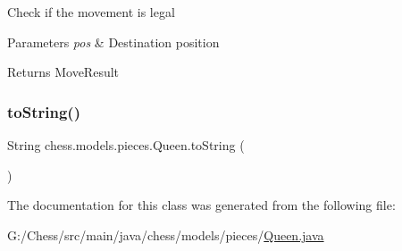 Check if the movement is legal 
\begin{DoxyParams}{Parameters}
{\em pos} & Destination position \\
\hline
\end{DoxyParams}
\begin{DoxyReturn}{Returns}
Move\+Result 
\end{DoxyReturn}
\mbox{\label{classchess_1_1models_1_1pieces_1_1_queen_a723a09d8252bb14578d33c099242e37d}} 
\subsubsection{\texorpdfstring{to\+String()}{toString()}}
{\footnotesize\ttfamily String chess.\+models.\+pieces.\+Queen.\+to\+String (\begin{DoxyParamCaption}{ }\end{DoxyParamCaption})}



The documentation for this class was generated from the following file\+:\begin{DoxyCompactItemize}
\item 
G\+:/\+Chess/src/main/java/chess/models/pieces/\mbox{\hyperlink{_queen_8java}{Queen.\+java}}\end{DoxyCompactItemize}
